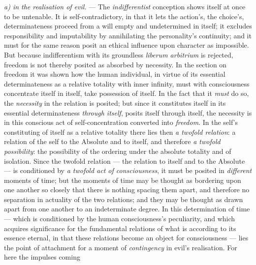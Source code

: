 \documentclass[12pt,a4paper]{book}
\begin{document}
\emph{a) in the realisation of evil.} --- The \emph{indifferentist} conception
shows itself at once to be untenable. It
is self-contradictory, in that it lets the action's, the choice's,
determinateness proceed from a will empty and undetermined in itself; it
excludes responsibility and imputability by annihilating the personality's
continuity; and it must for the same reason posit an ethical influence upon
character as impossible. But because indifferentism with its groundless
\textit{liberum arbitrium} is rejected, freedom is not thereby posited as
absorbed by necessity. In the section on freedom it was shown how the human
individual, in virtue of its essential determinateness as a relative totality
with inner infinity, must with consciousness concentrate itself in itself, take
possession of itself. In the fact that it \emph{must} do so, the
\emph{necessity} in the relation is posited; but since it constitutes itself in
its essential determinateness \emph{through itself}, posits itself through
itself, the necessity is in this conscious act of self-concentration converted
into \emph{freedom}. In the self's constituting of itself as a relative totality
there lies then \emph{a twofold relation}: a relation of the self to the
Absolute and to itself, and therefore \emph{a twofold possibility}: the
possibility of the ordering under the absolute totality and of isolation. Since
the twofold relation --- the relation to itself and to the Absolute --- is
conditioned by \emph{a twofold act of consciousness}, it must be posited in
\emph{different} moments of time; but the moments of time may be thought as
bordering upon one another so closely that there is nothing spacing them apart,
and therefore no separation in actuality of the two relations; and they may be
thought as drawn apart from one another to an indeterminate degree. In this
determination of time --- which is conditioned by the human consciousness's
peculiarity, and which acquires significance for the fundamental relations of
what is according to its essence eternal, in that these relations become an
object for consciousness --- lies the point of attachment for a moment of
\emph{contingency} in evil's realisation. For here the impulses coming
\end{document}
